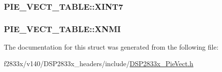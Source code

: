 \subsubsection[{X\+I\+N\+T7}]{ P\+I\+E\+\_\+\+V\+E\+C\+T\+\_\+\+T\+A\+B\+L\+E\+::\+X\+I\+N\+T7}\label{struct_p_i_e___v_e_c_t___t_a_b_l_e_addf2f320c5a409f7436bb6bf80149bff}
\hypertarget{struct_p_i_e___v_e_c_t___t_a_b_l_e_a425817e678266aca6a9fd3824693064d}{}
\subsubsection[{X\+N\+M\+I}]{ P\+I\+E\+\_\+\+V\+E\+C\+T\+\_\+\+T\+A\+B\+L\+E\+::\+X\+N\+M\+I}\label{struct_p_i_e___v_e_c_t___t_a_b_l_e_a425817e678266aca6a9fd3824693064d}


The documentation for this struct was generated from the following file\+:\begin{DoxyCompactItemize}
\item 
f2833x/v140/\+D\+S\+P2833x\+\_\+headers/include/\hyperlink{_d_s_p2833x___pie_vect_8h}{D\+S\+P2833x\+\_\+\+Pie\+Vect.\+h}\end{DoxyCompactItemize}
